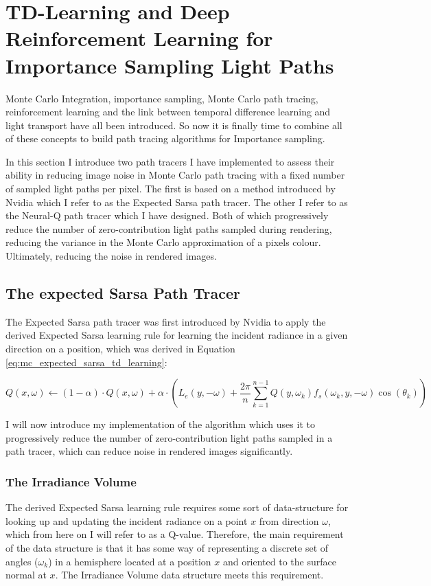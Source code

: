 \documentclass[../dissertation.tex]{subfiles}
\begin{document}
\chapter{TD-Learning and Deep Reinforcement Learning for Importance Sampling Light Paths}

Monte Carlo Integration, importance sampling, Monte Carlo path tracing, reinforcement learning and the link between temporal difference learning and light transport have all been introduced. So now it is finally time to combine all of these concepts to build path tracing algorithms for Importance sampling. 

In this section I introduce two path tracers I have implemented to assess their ability in reducing image noise in Monte Carlo path tracing with a fixed number of sampled light paths per pixel. The first is based on a method introduced by Nvidia \cite{dahm2017learning} which I refer to as the Expected Sarsa path tracer. The other I refer to as the Neural-Q path tracer which I have designed. Both of which progressively reduce the number of zero-contribution light paths sampled during rendering, reducing the variance in the Monte Carlo approximation of a pixels colour. Ultimately, reducing the noise in rendered images. 

\section{The expected Sarsa Path Tracer}
\label{sec:expecte_sarsa_path_tracer}

The Expected Sarsa path tracer was first introduced by Nvidia \cite{dahm2017learning} to apply the derived  Expected Sarsa learning rule for learning the incident radiance in a given direction on a position, which was derived in Equation \ref{eq:mc_expected_sarsa_td_learning}:

$$Q(x, \omega) \leftarrow (1 - \alpha) \cdot Q(x, \omega) + \alpha \cdot \left( L_e(y, -\omega) +\frac{2 \pi}{n} \sum_{k=1}^{n-1} Q(y, \omega_k) f_s(\omega_k, y, -\omega) \cos(\theta_k)  \right)$$

I will now introduce my implementation of the algorithm which uses it to progressively reduce the number of zero-contribution light paths sampled in a path tracer, which can reduce noise in rendered images significantly. 

\subsection{The Irradiance Volume}
The derived Expected Sarsa learning rule requires some sort of data-structure for looking up and updating the incident radiance on a point $x$ from direction $\omega$, which from here on I will refer to as a Q-value. Therefore, the main requirement of the data structure is that it has some way of representing a discrete set of angles ($\omega_k$) in a hemisphere located at a position $x$ and oriented to the surface normal at $x$. The Irradiance Volume data structure \cite{greger1998irradiance} meets this requirement.\\
\end{document}
